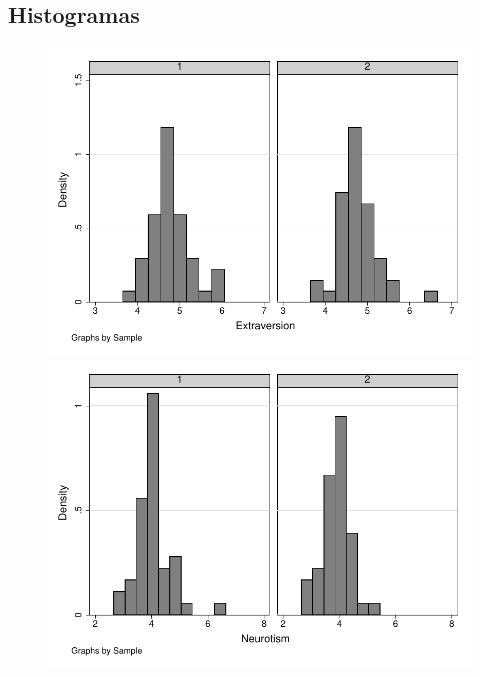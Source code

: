 \documentclass[12pt]{article}%
\begin{document}
\subsection{Histogramas}
\begin{figure}
	\centering
	\includegraphics[]{extraversion2.pdf}
	\includegraphics[]{neurotism2.pdf}
\end{figure}
\end{document}
